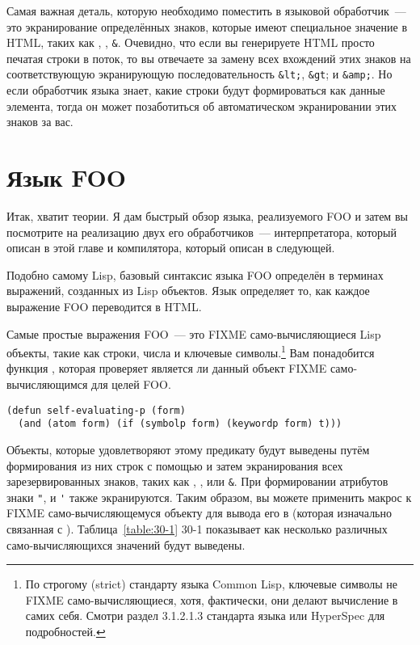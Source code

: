 Самая важная деталь, которую необходимо поместить в языковой обработчик~--- это
экранирование определённых знаков, которые имеют специальное значение в HTML, таких как
\code{<}, \code{>}, \lstinline!&!. Очевидно, что если вы генерируете HTML просто печатая
строки в поток, то вы отвечаете за замену всех вхождений этих знаков на соответствующую
экранирующую последовательность \lstinline!&lt;!, \lstinline!&gt!; и \lstinline!&amp;!. Но
если обработчик языка знает, какие строки будут формироваться как данные элемента, тогда
он может позаботиться об автоматическом экранировании этих знаков за вас.

\section{Язык FOO}

Итак, хватит теории. Я дам быстрый обзор языка, реализуемого FOO и затем вы посмотрите на
реализацию двух его обработчиков~--- интерпретатора, который описан в этой главе и
компилятора, который описан в следующей.

Подобно самому Lisp, базовый синтаксис языка FOO определён в терминах выражений, созданных
из Lisp объектов. Язык определяет то, как каждое выражение FOO переводится в HTML.

Самые простые выражения FOO~--- это FIXME само-вычисляющиеся Lisp объекты, такие как
строки, числа и ключевые символы.\footnote{По строгому (strict) стандарту языка Common
  Lisp, ключевые символы не FIXME само-вычисляющиеся, хотя, фактически, они делают
  вычисление в самих себя. Смотри раздел 3.1.2.1.3 стандарта языка или HyperSpec для
  подробностей.} Вам понадобится функция , которая проверяет
является ли данный объект FIXME само-вычисляющимся для целей FOO.

\begin{lstlisting}
(defun self-evaluating-p (form)
  (and (atom form) (if (symbolp form) (keywordp form) t)))
\end{lstlisting}

Объекты, которые удовлетворяют этому предикату будут выведены путём формирования из них
строк с помощью  и затем экранирования всех зарезервированных
знаков, таких как \code{<}, \code{>}, или \lstinline!&!. При формировании атрибутов знаки
\lstinline!"!, и \lstinline!'! также экранируются. Таким образом, вы можете применить
макрос  к FIXME само-вычисляющемуся объекту для вывода его в
 (которая изначально связанная с
). Таблица~\ref{table:30-1} 30-1 показывает как несколько
различных само-вычисляющихся значений будут выведены.


